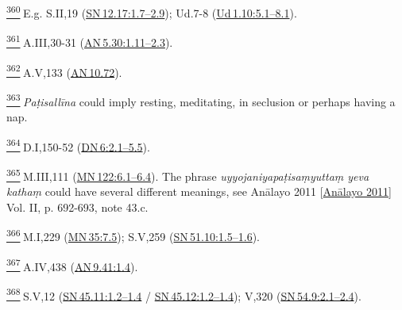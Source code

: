 \label{footprints_split_024.html_fn360}
\hyperref[footprints_split_011.htmlux5cux23fnref360]{\textsuperscript{360}} E.g.
S.II,19
(\href{https://suttacentral.net/sn12.17/en/sujato\#1.7}{SN\,12.17:1.7--2.9});
Ud.7-8
(\href{https://suttacentral.net/ud1.10/en/sujato\#5.1}{Ud\,1.10:5.1--8.1}).

\label{footprints_split_024.html_fn361}
\hyperref[footprints_split_011.htmlux5cux23fnref361]{\textsuperscript{361}} A.III,30-31
(\href{https://suttacentral.net/an5.30/en/sujato\#1.11}{AN\,5.30:1.11--2.3}).

\label{footprints_split_024.html_fn362}
\hyperref[footprints_split_011.htmlux5cux23fnref362]{\textsuperscript{362}} A.V,133
(\href{https://suttacentral.net/an10.72/en/sujato}{AN\,10.72}).

\label{footprints_split_024.html_fn363}
\hyperref[footprints_split_011.htmlux5cux23fnref363]{\textsuperscript{363}} \emph{Paṭisallīna}
could imply resting, meditating, in seclusion or perhaps having a nap.

\label{footprints_split_024.html_fn364}
\hyperref[footprints_split_011.htmlux5cux23fnref364]{\textsuperscript{364}} D.I,150-52
(\href{https://suttacentral.net/dn6/en/sujato\#2.1}{DN\,6:2.1--5.5}).

\label{footprints_split_024.html_fn365}
\hyperref[footprints_split_011.htmlux5cux23fnref365]{\textsuperscript{365}} M.III,111
(\href{https://suttacentral.net/mn122/en/sujato\#6.1}{MN\,122:6.1--6.4}).
The phrase \emph{uyyojaniyapaṭisaṃyuttaṃ yeva kathaṃ} could have several
different meanings, see {Anālayo 2011
{{[}\hyperref[footprints_split_022.htmlux5cux23Anux101layoux5cux25202011]{Anālayo
2011}{]}}} Vol. II, p. 692-693, note 43.c.

\label{footprints_split_024.html_fn366}
\hyperref[footprints_split_011.htmlux5cux23fnref366]{\textsuperscript{366}} M.I,229
(\href{https://suttacentral.net/mn35/en/sujato\#7.5}{MN\,35:7.5});
S.V,259
(\href{https://suttacentral.net/sn51.10/en/sujato\#1.5}{SN\,51.10:1.5--1.6}).

\label{footprints_split_024.html_fn367}
\hyperref[footprints_split_011.htmlux5cux23fnref367]{\textsuperscript{367}} A.IV,438
(\href{https://suttacentral.net/an9.41/en/sujato\#1.4}{AN\,9.41:1.4}).

\label{footprints_split_024.html_fn368}
\hyperref[footprints_split_011.htmlux5cux23fnref368]{\textsuperscript{368}} S.V,12
(\href{https://suttacentral.net/sn45.11/en/sujato\#1.2}{SN\,45.11:1.2--1.4}
/
\href{https://suttacentral.net/sn45.12/en/sujato\#1.2}{SN\,45.12:1.2--1.4});
V,320
(\href{https://suttacentral.net/sn54.9/en/sujato\#2.1}{SN\,54.9:2.1--2.4}).

